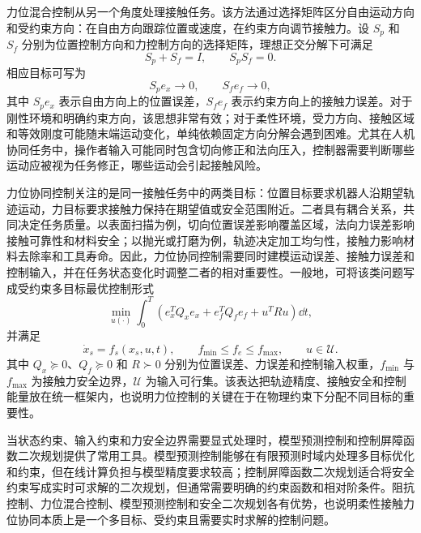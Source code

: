 力位混合控制从另一个角度处理接触任务。该方法通过选择矩阵区分自由运动方向和受约束方向：在自由方向跟踪位置或速度，在约束方向调节接触力\cite{mason1981compliance,raibert1981hybrid,khatib1987operational}。设 $S_p$ 和 $S_f$ 分别为位置控制方向和力控制方向的选择矩阵，理想正交分解下可满足
\begin{equation}
  S_p+S_f=I,\qquad S_pS_f=0 .
  \label{eq:ch2_selection_matrices}
\end{equation}
相应目标可写为
\begin{equation}
  S_pe_x\to0,\qquad S_fe_f\to0 ,
  \label{eq:ch2_hybrid_objective}
\end{equation}
其中 $S_pe_x$ 表示自由方向上的位置误差，$S_fe_f$ 表示约束方向上的接触力误差。对于刚性环境和明确约束方向，该思想非常有效；对于柔性环境，受力方向、接触区域和等效刚度可能随末端运动变化，单纯依赖固定方向分解会遇到困难。尤其在人机协同任务中，操作者输入可能同时包含切向修正和法向压入，控制器需要判断哪些运动应被视为任务修正，哪些运动会引起接触风险。

力位协同控制关注的是同一接触任务中的两类目标：位置目标要求机器人沿期望轨迹运动，力目标要求接触力保持在期望值或安全范围附近。二者具有耦合关系，共同决定任务质量。以表面扫描为例，切向位置误差影响覆盖区域，法向力误差影响接触可靠性和材料安全；以抛光或打磨为例，轨迹决定加工均匀性，接触力影响材料去除率和工具寿命。因此，力位协同控制需要同时建模运动误差、接触力误差和控制输入，并在任务状态变化时调整二者的相对重要性。一般地，可将该类问题写成受约束多目标最优控制形式
\begin{equation}
  \min_{u(\cdot)}\int_0^T
  \left(e_x^TQ_xe_x+e_f^TQ_fe_f+u^TRu\right)\dd t ,
  \label{eq:ch2_force_position_cost}
\end{equation}
并满足
\begin{equation}
  \dot x_s=f_s(x_s,u,t),\qquad
  f_{\min}\le f_e\le f_{\max},\qquad
  u\in\mathcal U .
  \label{eq:ch2_force_position_constraints}
\end{equation}
其中 $Q_x\succeq0$、$Q_f\succeq0$ 和 $R\succ0$ 分别为位置误差、力误差和控制输入权重，$f_{\min}$ 与 $f_{\max}$ 为接触力安全边界，$\mathcal U$ 为输入可行集。该表达把轨迹精度、接触安全和控制能量放在统一框架内，也说明力位控制的关键在于在物理约束下分配不同目标的重要性。

当状态约束、输入约束和力安全边界需要显式处理时，模型预测控制和控制屏障函数二次规划提供了常用工具\cite{rawlings2017mpc,ames2017cbf,ames2019cbf}。模型预测控制能够在有限预测时域内处理多目标优化和约束，但在线计算负担与模型精度要求较高；控制屏障函数二次规划适合将安全约束写成实时可求解的二次规划，但通常需要明确的约束函数和相对阶条件。阻抗控制、力位混合控制、模型预测控制和安全二次规划各有优势，也说明柔性接触力位协同本质上是一个多目标、受约束且需要实时求解的控制问题。

